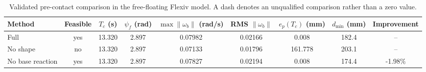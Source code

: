 \begin{table}[t]
\centering
\caption{Validated pre-contact comparison in the free-floating Flexiv model. A dash denotes an unqualified comparison rather than a zero value.}
\label{tab:precontact_comparison}
\begin{tabular}{lcccccccc}
\toprule
Method & Feasible & $T_c$ (s) & $\psi_f$ (rad) & $\max\|\omega_b\|$ (rad/s) & RMS $\|\omega_b\|$ & $e_p(T_c)$ (mm) & $d_{\min}$ (mm) & Improvement \\
\midrule
Full & yes & 13.320 & 2.897 & 0.07982 & 0.02166 & 0.008 & 182.4 & -- \\
No shape & no & 13.320 & 2.897 & 0.07133 & 0.01796 & 161.778 & 203.1 & -- \\
No base reaction & yes & 13.320 & 2.897 & 0.07827 & 0.02194 & 0.008 & 174.4 & -1.98\% \\
\bottomrule
\end{tabular}
\end{table}
